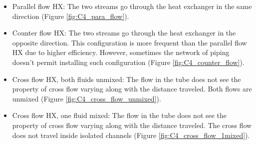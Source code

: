 \begin{itemize}
    \item Parallel flow HX: The two streams go through the heat exchanger in the same direction (Figure \ref{fig:C4_para_flow}).

    \item Counter flow HX: The two streams go through the heat exchanger in the opposite direction. This configuration is more frequent than the parallel flow HX due to higher efficiency. However, sometimes the network of piping doesn't permit installing such configuration (Figure \ref{fig:C4_counter_flow}).

    \item Cross flow HX, both fluids unmixed: The flow in the tube does not see the property of cross flow varying along with the distance traveled. Both flows are unmixed (Figure \ref{fig:C4_cross_flow_unmixed}).
  
    \item Cross flow HX, one fluid mixed: The flow in the tube does not see the property of cross flow varying along with the distance traveled. The cross flow does not travel inside isolated channels (Figure \ref{fig:C4_cross_flow_1mixed}).
\end{itemize}
